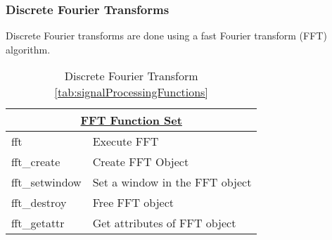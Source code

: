 \subsubsection*{Discrete Fourier Transforms} 
Discrete Fourier transforms are done using a fast Fourier transform (FFT) algorithm. 
\begin{table}[H]
\caption{Discrete Fourier Transform \ref{tab:signalProcessingFunctions}}
\label{tab:fftFunctions}
\begin{center}
\begin{tabular}{|l|l|}
\multicolumn{2}{c}{\hyperlink{fftFunc}{\rmfamily \bfseries FFT Function Set}} \\ \hline
fft & Execute FFT\\
fft\_create & Create FFT Object\\
fft\_setwindow & Set a window in the FFT object\\
fft\_destroy & Free FFT object\\
fft\_getattr & Get attributes of FFT object\\
\hline\end{tabular}
\end{center}
\label{default}
\end{table}%